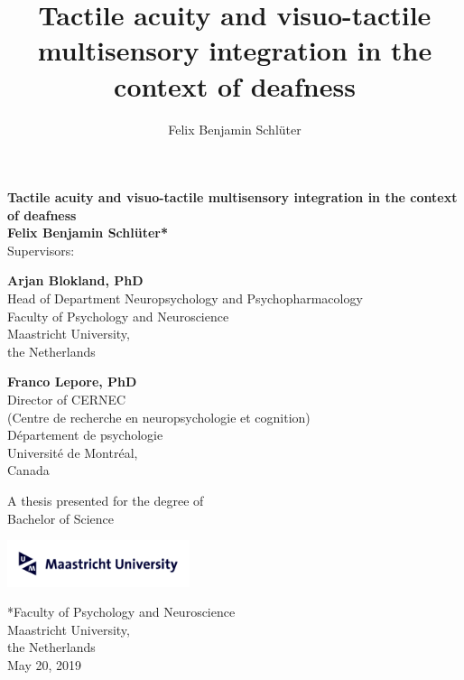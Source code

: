 \documentclass[12pt]{article}
\title{Tactile acuity and visuo-tactile multisensory integration in the context of deafness}
\author{Felix Benjamin Schlüter}
\date{}
\begin{document}
\begin{titlepage}
   \begin{center}
       \vspace*{1cm}
%
       \textbf{\huge{Tactile acuity and visuo-tactile multisensory integration in the context of deafness}}\\
% 
       \vspace{0.5cm}
%
       \vspace{1.5cm}
%
\textbf{Felix Benjamin Schlüter*}\\
       \vspace{1.5cm}
       Supervisors:\\
       \vspace{1.5cm}
      \begin{minipage}{0.35\textwidth}
            \centering
            \textbf{Arjan Blokland, PhD}\\
            Head of Department Neuropsychology and Psychopharmacology\\
            Faculty of Psychology  and Neuroscience\\
            Maastricht University,\\
            the Netherlands\\
      \end{minipage}
      \hspace{1.5cm}
      \begin{minipage}{0.35\textwidth}
            \centering
            \textbf{Franco Lepore, PhD}\\
            Director of CERNEC\\
            (Centre de recherche en neuropsychologie et cognition)\\
            Département de psychologie\\
            Université de Montréal,\\
            Canada\\
            \vspace{\baselineskip}
       \end{minipage}
       \vfill
 
       A thesis presented for the degree of\\
       Bachelor of Science
 
       \vspace{0.8cm}
 
       \includegraphics[width=0.4\textwidth]{UMLogo.png}
 
       *Faculty of Psychology and Neuroscience\\
       Maastricht University,\\
       the Netherlands\\
       May 20, 2019
 
   \end{center}
\end{titlepage}
\newpage
\tableofcontents
\newpage
\end{document}
